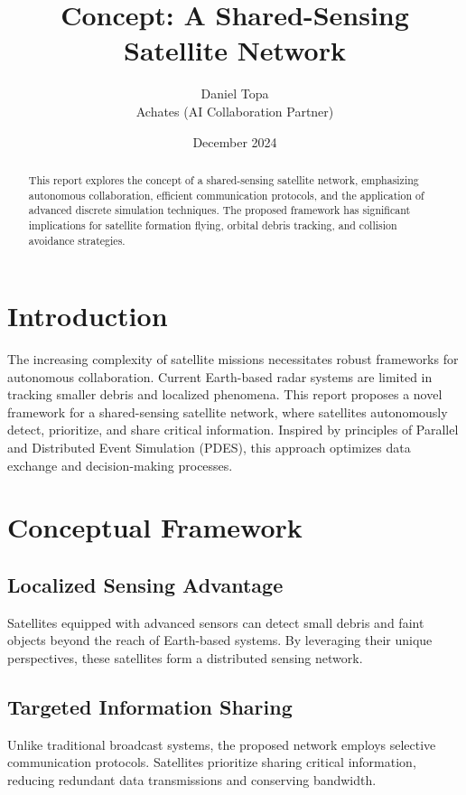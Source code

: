 \documentclass[11pt]{article}
\title{Concept: A Shared-Sensing Satellite Network}
\author{Daniel Topa \\ Achates (AI Collaboration Partner)}
\date{December 2024}
\begin{document}
\maketitle

\begin{abstract}
This report explores the concept of a shared-sensing satellite network, emphasizing autonomous collaboration, efficient communication protocols, and the application of advanced discrete simulation techniques. The proposed framework has significant implications for satellite formation flying, orbital debris tracking, and collision avoidance strategies.
\end{abstract}

\section{Introduction}
The increasing complexity of satellite missions necessitates robust frameworks for autonomous collaboration. Current Earth-based radar systems are limited in tracking smaller debris and localized phenomena. This report proposes a novel framework for a shared-sensing satellite network, where satellites autonomously detect, prioritize, and share critical information. Inspired by principles of Parallel and Distributed Event Simulation (PDES), this approach optimizes data exchange and decision-making processes.

\section{Conceptual Framework}
\subsection{Localized Sensing Advantage}
Satellites equipped with advanced sensors can detect small debris and faint objects beyond the reach of Earth-based systems. By leveraging their unique perspectives, these satellites form a distributed sensing network.

\subsection{Targeted Information Sharing}
Unlike traditional broadcast systems, the proposed network employs selective communication protocols. Satellites prioritize sharing critical information, reducing redundant data transmissions and conserving bandwidth.
\end{document}

